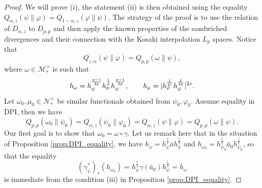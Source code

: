 \documentclass[12pt]{article}
\theoremstyle{definition}
\theoremstyle{remark}
\numberwithin{equation}{section}
\def\Me{\mathcal M}
\def\Ne{\mathcal N}
\def\ffi{\varphi}
\begin{document}
\begin{proof} We will prove (i), the statement (ii) is then obtained using the equality
$Q_{\alpha,z}(\psi\|\ffi)=Q_{1-\alpha,z}(\ffi\|\psi)$. 
The strategy of the proof is to use the relation of $D_{\alpha,z}$ to $D_{p,p}$ and then apply the known
properties of the sandwiched divergences and their connection with the Kosaki interpolation $L_p$
spaces.  Notice that
\[
Q_{z,\alpha}(\psi\|\ffi)=Q_{p,p}(\omega\|\psi),
\]
where $\omega\in \Me_*^+$ is such that
\begin{equation}\label{eq:omega}
h_\omega=h_\psi^{p-1\over 2p}h_\mu^{\frac1p}h_\psi^{p-1\over 2p},\qquad
h_{\mu}=|h_{\ffi}^{1\over 2r}h_{\psi}^{1\over 2p}|^{2z}.
\end{equation}
Let $\omega_0,\mu_0\in \Ne_*^+$ be similar functionals obtained from $\psi_0,\ffi_0$.
Assume equality in DPI, then
we have
\[
Q_{p,p}(\omega_0\|\psi_0)=Q_{\alpha,z}(\psi_0\|\ffi_0)=Q_{\alpha,z}(\psi\|\ffi)=Q_{p,p}(\omega\|\psi).
\]
Our first goal is to show that $\omega_0=\omega\circ\gamma$. Let us remark here that in the situation of Proposition \ref{prop:DPI_equality}, we have
$h_\omega=h_\psi^{\frac12}\bar ah_\psi^{\frac12}$ and
$h_{\omega_0}=h_{\psi_0}^{\frac12}\bar a_0h_{\psi_0}^{\frac12}$, so that the equality
\[
(\gamma^*_{\psi})_*(h_{\omega_0})=h_\psi^{\frac12}\gamma(\bar
a_0)h_\psi^{\frac12}=h_\omega
\]
is immediate from the condition (iii) in Proposition \ref{prop:DPI_equality}.


\end{proof}
\end{document}
